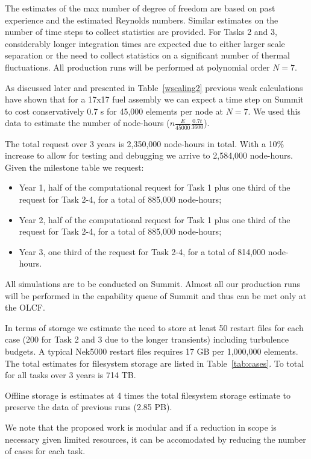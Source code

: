 The estimates of the max number of degree of freedom are based  on past
experience and the estimated Reynolds numbers. Similar estimates on the number
of time steps to collect statistics are provided. For Tasks 2 and 3,
considerably longer integration times are expected due to either larger scale
separation or the need to collect statistics on a significant number of thermal
fluctuations. All production runs will be performed at polynomial order $N=7$.

As discussed later and presented in Table~\ref{wscaling2} previous weak
calculations have shown that for a 17x17 fuel assembly we can expect a time
step on Summit to cost conservatively 0.7 s for 45,000 elements per node at $N=7$. We
used this data to estimate the number of node-hours
($n\frac{E}{45000}\frac{0.7t}{3600}$).

The total request over 3 years is 2,350,000 node-hours in total. With a 10\% increase to allow for testing and debugging we arrive to 2,584,000 node-hours. Given the milestone table we request:
\begin{itemize}
    \item Year 1, half of the computational request for Task 1 plus one third of the request for Task 2-4, for a total of 885,000 node-hours;
    \item Year 2, half of the computational request for Task 1 plus one third of the request for Task 2-4, for a total of 885,000 node-hours;
    \item Year 3, one third of the request for Task 2-4, for a total of 814,000 node-hours.
\end{itemize}
All simulations are to be conducted on Summit. Almost all our production runs will be performed in the capability queue of Summit and thus can be met only at the OLCF.

In terms of storage we estimate the need to store at least 50 restart files for each case (200 for Task 2 and 3 due to the longer transients) including turbulence budgets. A typical Nek5000 restart files requires 17 GB per 1,000,000 elements. The total estimates for filesystem storage are listed in Table~\ref{tab:cases}. To total for all tasks over 3 years is 714 TB.

Offline storage is estimates at 4 times the total filesystem storage estimate to preserve the  data of previous runs (2.85 PB).

We note that the proposed work is modular and if a reduction in scope is necessary given limited resources,  it can be accomodated by reducing the number of cases for each task.

